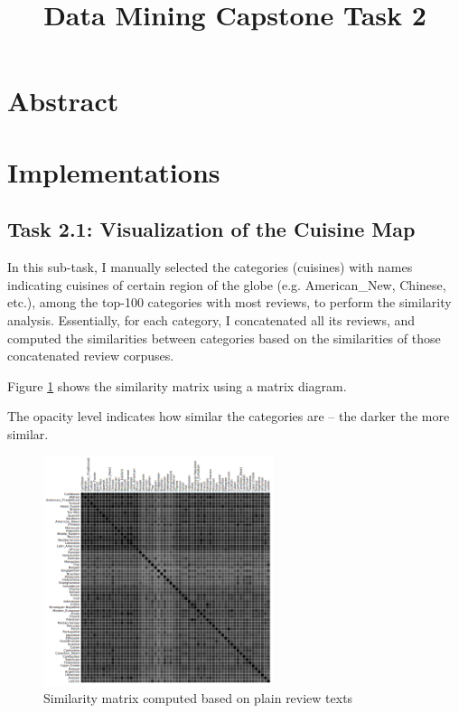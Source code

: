 \documentclass[11pt]{article}
\title{Data Mining Capstone Task 2}
\begin{document}
\maketitle

\section{Abstract}

\section{Implementations}
\subsection{Task 2.1: Visualization of the Cuisine Map}
In this sub-task, I manually selected the categories (cuisines) with names indicating cuisines of certain region of the globe (e.g. American\_New, Chinese, etc.), among the top-100 categories with most reviews, to perform the similarity analysis.
Essentially, for each category, I concatenated all its reviews, and computed the similarities between categories based on the similarities of those concatenated review corpuses.

\vspace{1em}
Figure \ref{fig:text_repr} shows the similarity matrix using a matrix diagram.

The opacity level indicates how similar the categories are -- the darker the more similar.

\begin{figure}[htp!]
  \centering
  \includegraphics[width=0.6\textwidth]{./img/text_repr.png}
  \caption{Similarity matrix computed based on plain review texts}
  \label{fig:text_repr}
\end{figure}
\end{document}
